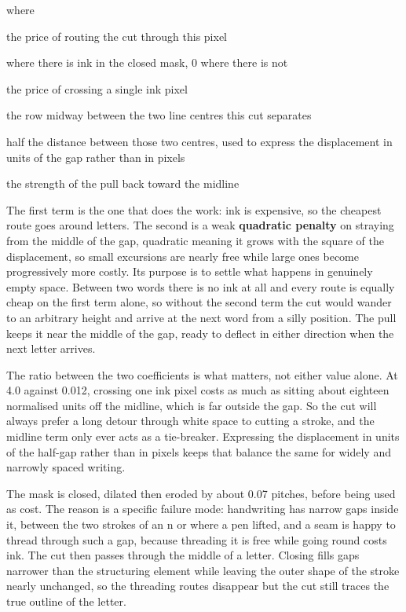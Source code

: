 \noindent where
\begin{description}[leftmargin=2.4em,style=nextline,font=\normalfont\ttfamily]\setlength\itemsep{1pt}
  \item[{$\mathrm{cost}[y,x]$}] \normalfont the price of routing the cut through this pixel
  \item[{$m[y,x]$}]  where there is ink in the closed mask, 0 where there is not
  \item[{$4.0$}] \normalfont the price of crossing a single ink pixel
  \item[{$y_{\mathrm{mid}}$}] \normalfont the row midway between the two line centres this cut separates
  \item[{$g$}] \normalfont half the distance between those two centres, used to express the displacement in units of the gap rather than in pixels
  \item[{$0.012$}] \normalfont the strength of the pull back toward the midline
\end{description}
The first term is the one that does the work: ink is expensive, so the cheapest route goes around letters. The second is a weak \textbf{quadratic penalty} on straying from the middle of the gap, quadratic meaning it grows with the square of the displacement, so small excursions are nearly free while large ones become progressively more costly. Its purpose is to settle what happens in genuinely empty space. Between two words there is no ink at all and every route is equally cheap on the first term alone, so without the second term the cut would wander to an arbitrary height and arrive at the next word from a silly position. The pull keeps it near the middle of the gap, ready to deflect in either direction when the next letter arrives.

The ratio between the two coefficients is what matters, not either value alone. At 4.0 against 0.012, crossing one ink pixel costs as much as sitting about eighteen normalised units off the midline, which is far outside the gap. So the cut will always prefer a long detour through white space to cutting a stroke, and the midline term only ever acts as a tie-breaker. Expressing the displacement in units of the half-gap rather than in pixels keeps that balance the same for widely and narrowly spaced writing.


The mask is closed, dilated then eroded by about 0.07 pitches, before being used as cost. The reason is a specific failure mode: handwriting has narrow gaps inside it, between the two strokes of an n or where a pen lifted, and a seam is happy to thread through such a gap, because threading it is free while going round costs ink. The cut then passes through the middle of a letter. Closing fills gaps narrower than the structuring element while leaving the outer shape of the stroke nearly unchanged, so the threading routes disappear but the cut still traces the true outline of the letter.

